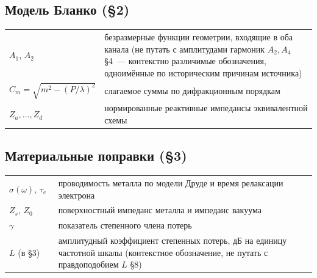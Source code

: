 \subsection*{Модель Бланко (§2)}
\begin{center}
\footnotesize
\setlength{\tabcolsep}{6pt}
\begin{tabular}{@{}p{0.16\linewidth}p{0.84\linewidth}@{}}
\toprule
$A_1$, $A_2$ & безразмерные функции геометрии, входящие в оба канала (не путать с амплитудами
гармоник $A_2,A_4$ §4~--- контекстно различимые обозначения, одноимённые по историческим причинам
источника) \\
$C_m=\sqrt{m^2-(P/\lambda)^2}$ & слагаемое суммы по дифракционным порядкам \\
$Z_a,\ldots,Z_d$ & нормированные реактивные импедансы эквивалентной схемы \\
\bottomrule
\end{tabular}
\end{center}

\subsection*{Материальные поправки (§3)}
\begin{center}
\footnotesize
\setlength{\tabcolsep}{6pt}
\begin{tabular}{@{}p{0.16\linewidth}p{0.84\linewidth}@{}}
\toprule
$\sigma(\omega)$, $\tau_e$ & проводимость металла по модели Друде и время релаксации электрона \\
$Z_s$, $Z_0$ & поверхностный импеданс металла и импеданс вакуума \\
$\gamma$ & показатель степенного члена потерь \\
$L$ (в §3) & амплитудный коэффициент степенных потерь, дБ на единицу частотной шкалы (контекстное
обозначение, не путать с правдоподобием $L$ §8) \\
\bottomrule
\end{tabular}
\end{center}

